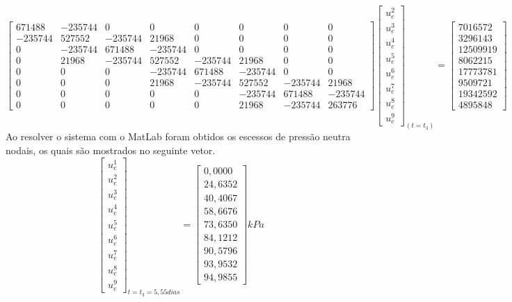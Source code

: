 \documentclass{article} %
\begin{document}
\begin{equation*}
\begin{bmatrix}
671488& -235744& 0& 0& 0& 0& 0& 0\\
-235744&527552&-235744&21968& 0& 0& 0& 0\\
0&-235744&671488&-235744& 0& 0& 0& 0\\
0&21968&-235744&527552&-235744&21968& 0& 0\\
0&0&0& -235744&671488&-235744& 0& 0\\
0&0&0&21968&-235744&527552&-235744&21968\\
0&0&0&0&0&-235744&671488&-235744\\
0&0&0&0&0&21968&-235744&263776
\end{bmatrix}\begin{bmatrix}
u_e^2\\
u_e^3\\
u_e^4\\
u_e^5\\
u_e^6\\
u_e^7\\
u_e^8\\
u_e^9
\end{bmatrix}_{(t=t_3)}
=\begin{bmatrix}
7016572\\
3296143\\
12509919\\
8062215\\
17773781\\
9509721\\
19342592\\
4895848
\end{bmatrix}
\end{equation*}
\indent Ao resolver o sistema com o MatLab foram obtidos os escessos de pressão neutra nodais, os quais são mostrados no seguinte vetor.
\begin{equation}\label{t3}
\begin{bmatrix}
u_e^1\\
u_e^2\\
u_e^3\\
u_e^4\\
u_e^5\\
u_e^6\\
u_e^7\\
u_e^8\\
u_e^9
\end{bmatrix}_{t=t_3=5,55dias}=\begin{bmatrix}
0,0000\\
24,6352\\
40,4067\\
58,6676\\
73,6350\\
84,1212\\
90,5796\\
93,9532\\
94,9855
\end{bmatrix}kPa
\end{equation}
\end{document}
